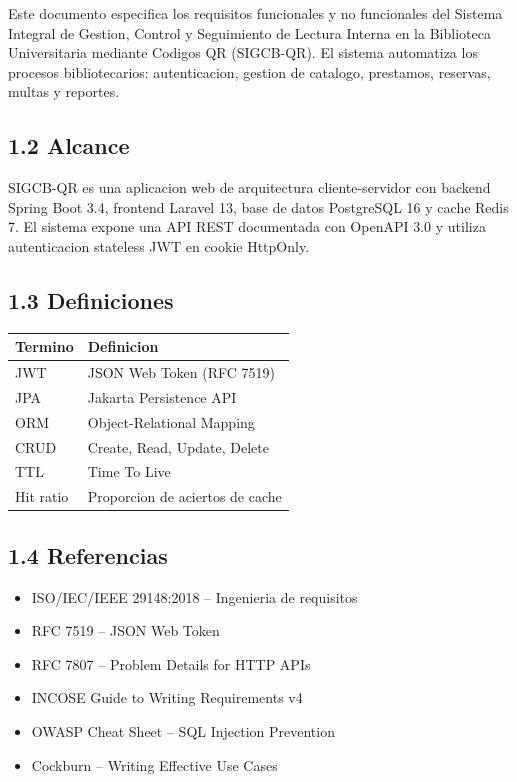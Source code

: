 \documentclass[
11pt,
a4paper,
]{report}
\providecommand{\tightlist}{%
	\setlength{\itemsep}{0pt}\setlength{\parskip}{0pt}}
\begin{document}
	Este documento especifica los requisitos funcionales y no funcionales del Sistema Integral de Gestion, Control y Seguimiento de Lectura Interna en la Biblioteca Universitaria mediante Codigos QR (SIGCB-QR). El sistema automatiza los procesos bibliotecarios: autenticacion, gestion de catalogo, prestamos, reservas, multas y reportes.
	
	\hypertarget{alcance}{%
		\subsection{1.2 Alcance}\label{alcance}}
	
	SIGCB-QR es una aplicacion web de arquitectura cliente-servidor con backend Spring Boot 3.4, frontend Laravel 13, base de datos PostgreSQL 16 y cache Redis 7. El sistema expone una API REST documentada con OpenAPI 3.0 y utiliza autenticacion stateless JWT en cookie HttpOnly.
	
	\hypertarget{definiciones}{%
		\subsection{1.3 Definiciones}\label{definiciones}}
	
	\begin{longtable}[]{@{}ll@{}}
		\toprule\noalign{}
		Termino & Definicion \\
		\midrule\noalign{}
		\endhead
		\bottomrule\noalign{}
		\endlastfoot
		JWT & JSON Web Token (RFC 7519) \\
		JPA & Jakarta Persistence API \\
		ORM & Object-Relational Mapping \\
		CRUD & Create, Read, Update, Delete \\
		TTL & Time To Live \\
		Hit ratio & Proporcion de aciertos de cache \\
	\end{longtable}
	
	\hypertarget{referencias}{%
		\subsection{1.4 Referencias}\label{referencias}}
	
	\begin{itemize}
		\tightlist
		\item
		ISO/IEC/IEEE 29148:2018 -- Ingenieria de requisitos
		\item
		RFC 7519 -- JSON Web Token
		\item
		RFC 7807 -- Problem Details for HTTP APIs
		\item
		INCOSE Guide to Writing Requirements v4
		\item
		OWASP Cheat Sheet -- SQL Injection Prevention
		\item
		Cockburn -- Writing Effective Use Cases
	\end{itemize}
	
\end{document}
